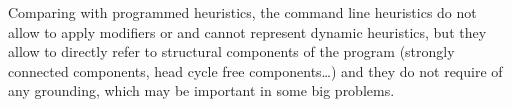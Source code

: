 Comparing with programmed heuristics, 
the command line heuristics do not allow to apply modifiers  or  
and cannot represent dynamic heuristics,
but they allow to directly refer to structural components of the program 
(strongly connected components, head cycle free components\ldots)
and they do not require of any grounding, 
which may be important in some big problems.


